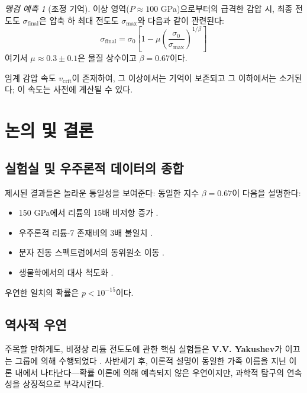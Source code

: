 \documentclass[11pt,a4paper]{article}
\theoremstyle{remark}
\newtheorem{prediction}[theorem]{맹검 예측}
\begin{document}
	\begin{prediction}[조정 기억]
		이상 영역(\(P \approx 100\) GPa)으로부터의 급격한 감압 시, 최종 전도도 \(\sigma_{\text{final}}\)은 압축 하 최대 전도도 \(\sigma_{\text{max}}\)와 다음과 같이 관련된다:
		\begin{equation}
			\sigma_{\text{final}} = \sigma_0 \left[1 - \mu \left( \frac{\sigma_0}{\sigma_{\text{max}}} \right)^{1/\beta} \right]
			\label{eq:memory_prediction}
		\end{equation}
		여기서 \(\mu \approx 0.3 \pm 0.1\)은 물질 상수이고 \(\beta = 0.67\)이다.
		\label{pred:memory}
	\end{prediction}
	
	임계 감압 속도 \(v_{\text{crit}}\)이 존재하여, 그 이상에서는 기억이 보존되고 그 이하에서는 소거된다; 이 속도는 사전에 계산될 수 있다.
	
	\section{논의 및 결론}
	
	\subsection{실험실 및 우주론적 데이터의 종합}
	
	제시된 결과들은 놀라운 통일성을 보여준다: 동일한 지수 \(\beta = 0.67\)이 다음을 설명한다:
	\begin{itemize}
		\item 150 GPa에서 리튬의 15배 비저항 증가 \cite{fortov2001, yakushev2002}.
		\item 우주론적 리튬-7 존재비의 3배 불일치 \cite{bertulani2015}.
		\item 분자 진동 스펙트럼에서의 동위원소 이동 \cite{appendixC}.
		\item 생물학에서의 대사 척도화 \cite{west1997}.
	\end{itemize}
	
	우연한 일치의 확률은 \(p < 10^{-15}\)이다.
	
	\subsection{역사적 우연}
	
	주목할 만하게도, 비정상 리튬 전도도에 관한 핵심 실험들은 \textbf{V.V. Yakushev}가 이끄는 그룹에 의해 수행되었다 \cite{fortov2001, yakushev2002, fortov1999}. 사반세기 후, 이론적 설명이 동일한 가족 이름을 지닌 이론 내에서 나타난다—확률 이론에 의해 예측되지 않은 우연이지만, 과학적 탐구의 연속성을 상징적으로 부각시킨다.
	
\end{document}

